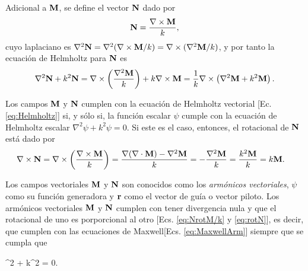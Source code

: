 Adicional a $\vb{M}$, se define el vector $\vb{N}$ dado por 
	\begin{align}
	\vb{N} = \frac{\nabla\times \vb{M}}{k}, \label{eq:NrotM/k}
	\end{align}
cuyo laplaciano es $\nabla^2 \vb{N} = \nabla^2( \nabla\times \vb{M} /k) =  \nabla\times (\nabla^2\vb{M} /k) $, y por tanto la ecuación de Helmholtz para $\vb{N}$ es
	\begin{align*}
	\nabla^2 \vb{N} + k^2 \vb{N} =  \nabla\times \left( \frac{\nabla^2 \vb{M}}{k} \right) + k \nabla\times \vb{M} 
		 = \frac{1}{k} \nabla\times \left( \nabla^2 \vb{M} + k^2  \vb{M} \right).
	\end{align*}
	
Los campos $\vb{M}$ y $\vb{N}$ cumplen con la  ecuación de Helmholtz vectorial [Ec. \eqref{eq:Helmholtz}] si, y sólo si, la función escalar $\psi$ cumple con la ecuación de Helmholtz escalar $\nabla^2 \psi + k^2 \psi = 0$. Si este es el caso, entonces, el rotacional de $\vb{N}$ está dado por
	\begin{align}
	\nabla\times \vb{N} &= \nabla\times \qty(\frac{\nabla\times \vb{M}}{k})  
						= \frac{\nabla\qty(\nabla\cdot\vb{M})-\nabla^2\vb{M}}{k}
						= - \frac{\nabla^2 \vb{M}}{k}
						= \frac{k^2 \vb{M}}{k}
						= k \vb{M}.\label{eq:rotN}
	\end{align}
	
Los campos vectoriales $\vb{M}$ y $\vb{N}$ son conocidos como los \emph{armónicos  vectoriales}, $\psi$ como su función generadora y $\vb{r}$ como el vector de guía o vector piloto. Los armónicos vectoriales $\vb{M}$ y $\vb{N}$  cumplen con tener divergencia nula y que el rotacional de uno es porporcional al otro [Ecs. \eqref{eq:NrotM/k} y \eqref{eq:rotN}], es decir, que cumplen con las ecuaciones de Maxwell[Ecs. \eqref{eq:MaxwellArm}] siempre que se cumpla que\vspace*{-.5em}
	\begin{tcolorbox}[title = $\mathbf{\psi}$: Función generadora de los armónicos  vectoriales, ams align ]
	\nabla^2 \psi + k^2 \psi  = 0.\label{eq:AV_psi}
	\end{tcolorbox}


